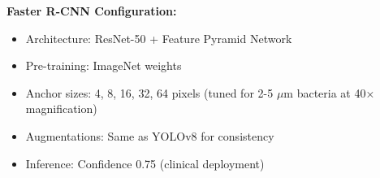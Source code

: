 \documentclass[sigconf, review, nonacm]{acmart}
\begin{document}
\noindent\textbf{Faster R-CNN Configuration:}
\begin{itemize}[leftmargin=*, itemsep=2pt]
    \item Architecture: ResNet-50 + Feature Pyramid Network
    \item Pre-training: ImageNet weights  
    \item Anchor sizes: 4, 8, 16, 32, 64 pixels (tuned for 2-5 $\mu$m bacteria at 40× magnification)
    \item Augmentations: Same as YOLOv8 for consistency
    \item Inference: Confidence 0.75 (clinical deployment)
\end{itemize}

\FloatBarrier
\end{document}
